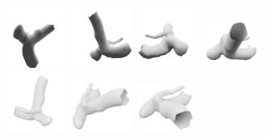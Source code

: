 \documentclass[%
 reprint,
 amsmath,amssymb,
 aps,
 floatfix,
 nofootinbib,
]{revtex4-2}
\begin{document}
\begin{figure}
  \centering
  \begin{subfigure}[b]{0.44\textwidth}
    \centering
    \includegraphics[width=0.22\textwidth]{003.png}
    \includegraphics[width=0.22\textwidth]{016.png}
    \includegraphics[width=0.22\textwidth]{030.png}
    \includegraphics[width=0.22\textwidth]{087.png}
    \vspace{0.2cm} %
    \includegraphics[width=0.22\textwidth]{129.png}
    \includegraphics[width=0.22\textwidth]{131.png}
    \includegraphics[width=0.22\textwidth]{135.png}

\end{subfigure}
\end{figure}
\end{document}
